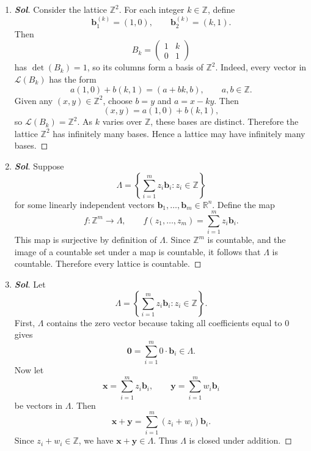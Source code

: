\begin{enumerate}
\begin{proof}[\normalfont\color{magenta}\bfseries Sol]
\begin{center}
\begin{tikzpicture}[scale=0.7, >=Stealth]
			\end{tikzpicture}
		\end{center}
	\end{proof}
	\newpage
	\item 
	\begin{proof}[\normalfont\color{magenta}\bfseries Sol]
		Consider the lattice \(\mathbb Z^2\). For each integer \(k\in\mathbb Z\), define
		\[
		\mathbf b_1^{(k)}=(1,0),
		\qquad
		\mathbf b_2^{(k)}=(k,1).
		\]
		Then
		\[
		B_k=
		\begin{pmatrix}
			1 & k\\
			0 & 1
		\end{pmatrix}
		\]
		has \(\det (B_k)=1\), so its columns form a basis of \(\mathbb Z^2\).	
		Indeed, every vector in \(\mathcal L(B_k)\) has the form
		\[
		a(1,0)+b(k,1)=(a+bk,b),
		\qquad a,b\in\mathbb Z.
		\]
		Given any \((x,y)\in\mathbb Z^2\), choose \(b=y\) and \(a=x-ky\). Then
		\[
		(x,y)=a(1,0)+b(k,1),
		\]
		so \(\mathcal L(B_k)=\mathbb Z^2\).	As \(k\) varies over \(\mathbb Z\), these bases are distinct. Therefore the lattice \(\mathbb Z^2\) has infinitely many bases.
		Hence a lattice may have infinitely many bases.
	\end{proof}
	\item 
	\begin{proof}[\normalfont\color{magenta}\bfseries Sol]
		Suppose
		\[
		\Lambda=\left\{\sum_{i=1}^m z_i\mathbf b_i:z_i\in\mathbb Z\right\}
		\]
		for some linearly independent vectors \(\mathbf b_1,\dots,\mathbf b_m\in\mathbb R^n\).
		Define the map
		\[
		f:\mathbb Z^m\to\Lambda,
		\qquad
		f(z_1,\dots,z_m)=\sum_{i=1}^m z_i\mathbf b_i.
		\]
		This map is surjective by definition of \(\Lambda\). Since \(\mathbb Z^m\) is countable, and the image of a countable set under a map is countable, it follows that \(\Lambda\) is countable.
		Therefore every lattice is countable.
	\end{proof}
	\item 
	\begin{proof}[\normalfont\color{magenta}\bfseries Sol]
		Let
		\[
		\Lambda=\left\{\sum_{i=1}^m z_i\mathbf b_i:z_i\in\mathbb Z\right\}.
		\]
		First, \(\Lambda\) contains the zero vector because taking all coefficients equal to \(0\) gives
		\[
		\mathbf 0=\sum_{i=1}^m 0\cdot \mathbf b_i\in\Lambda.
		\]
		Now let
		\[
		\mathbf x=\sum_{i=1}^m z_i\mathbf b_i,
		\qquad
		\mathbf y=\sum_{i=1}^m w_i\mathbf b_i
		\]
		be vectors in \(\Lambda\). Then
		\[
		\mathbf x+\mathbf y
		=
		\sum_{i=1}^m (z_i+w_i)\mathbf b_i.
		\]
		Since \(z_i+w_i\in\mathbb Z\), we have \(\mathbf x+\mathbf y\in\Lambda\). Thus \(\Lambda\) is closed under addition.

\end{proof}
\end{enumerate}
